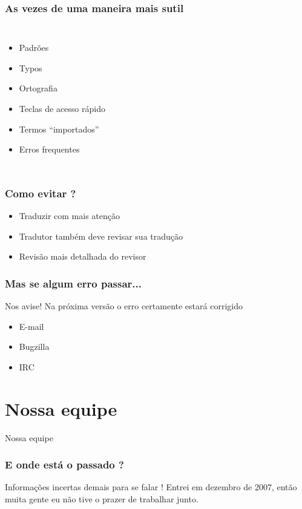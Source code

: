 \documentclass{beamer}
\begin{document}
\begin{frame}
  \frametitle{As vezes de uma maneira mais sutil}
  \begin{columns}
    \column{1.5in}
    \begin{itemize}[<+->]
      \item Padrões
      \item Typos
      \item Ortografia  
      \item Teclas de acesso rápido
      \item Termos ``importados''
      \item Erros frequentes
    \end{itemize}
    \column{1.5in}
  \end{columns}
\end{frame}

\begin{frame}
  \frametitle{Como evitar ?}

  \begin{itemize}[<+->]
    \item Traduzir com mais atenção
    \item Tradutor também deve revisar sua tradução
    \item Revisão mais detalhada do revisor
  \end{itemize}
\end{frame}

\begin{frame}
  \frametitle{Mas se algum erro passar...}
  Nos avise! Na próxima versão o erro certamente estará corrigido
  \begin{itemize}[<+->]
    \item E-mail
    \item Bugzilla
    \item IRC
  \end{itemize}
\end{frame}


\section{Nossa equipe}


\begin{frame}
  \centering
  \Huge{Nossa equipe}
\end{frame}

\begin{frame}
    \frametitle{E onde está o passado ?}
    Informações incertas demais para se falar ! Entrei em dezembro de 2007, então muita gente eu não tive
    o prazer de trabalhar junto. 
\end{frame}
\end{document}
